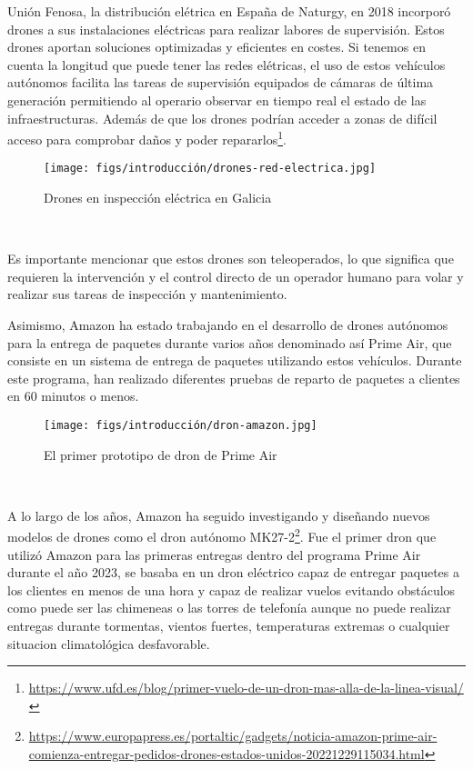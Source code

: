 Unión Fenosa, la distribución elétrica en España de Naturgy, en 2018 incorporó drones a sus instalaciones eléctricas para realizar labores de supervisión. Estos drones aportan 
soluciones optimizadas y eficientes en costes. Si tenemos en cuenta la longitud que puede tener las redes elétricas, el uso de estos vehículos
autónomos facilita las tareas de supervisión equipados de cámaras de última generación permitiendo al operario observar en tiempo real el estado de las infraestructuras. Además de que los
drones podrían acceder a zonas de difícil acceso para comprobar daños y poder repararlos\footnote{\url{https://www.ufd.es/blog/primer-vuelo-de-un-dron-mas-alla-de-la-linea-visual/}}. \newline 


\begin{figure} [H]
  \begin{center}
    \texttt{[image: figs/introducción/drones-red-electrica.jpg]}
  \end{center}
  \caption{Drones en inspección eléctrica en Galicia}
  \label{fig:Fenosa}
\end{figure}\

Es importante mencionar que estos drones son teleoperados, lo que significa que requieren la intervención y el control directo de un operador humano para volar y realizar sus tareas 
de inspección y mantenimiento.\newline

Asimismo, Amazon ha estado trabajando en el desarrollo de drones autónomos para la entrega de paquetes durante varios años denominado así Prime Air\cite{AmazonPrimeAir}, 
que consiste en un sistema de entrega de paquetes utilizando estos vehículos. Durante este programa, han realizado diferentes pruebas de reparto de paquetes a clientes
en 60 minutos o menos. \newline

\begin{figure} [H]
  \begin{center}
    \texttt{[image: figs/introducción/dron-amazon.jpg]}
  \end{center}
  \caption{El primer prototipo de dron de Prime Air}
  \label{fig:PrimerPrimeAir}
\end{figure}\

A lo largo de los años, Amazon ha seguido investigando y diseñando nuevos modelos de drones como el dron autónomo MK27-2\footnote{\url{https://www.europapress.es/portaltic/gadgets/noticia-amazon-prime-air-comienza-entregar-pedidos-drones-estados-unidos-20221229115034.html}}. Fue el primer 
dron que utilizó Amazon para 
las primeras entregas dentro del programa Prime Air durante el año 2023, se basaba en un dron eléctrico capaz de entregar paquetes a los clientes en menos de una
hora y capaz de realizar vuelos evitando obstáculos como puede ser las chimeneas o las torres de telefonía aunque no puede realizar entregas durante tormentas, vientos fuertes, temperaturas
extremas o cualquier situacion climatológica desfavorable. 

